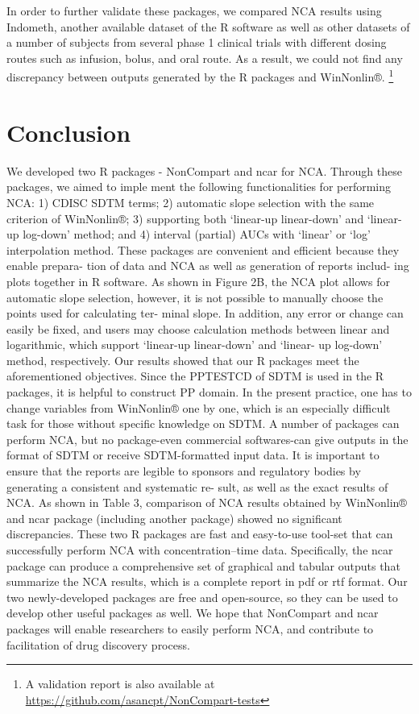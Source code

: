 \documentclass[12pt,]{krantz}
\theoremstyle{definition}
\theoremstyle{definition}
\theoremstyle{definition}
\theoremstyle{remark}
\begin{document}
In order to further validate these packages, we compared NCA results
using Indometh, another available dataset of the R software as well as
other datasets of a number of subjects from several phase 1 clinical
trials with different dosing routes such as infusion, bolus, and oral
route. As a result, we could not find any discrepancy between outputs
generated by the R packages and WinNonlin®. \footnote{A validation
  report is also available at
  \url{https://github.com/asancpt/NonCompart-tests}}

\hypertarget{conclusion}{%
\chapter{Conclusion}\label{conclusion}}

We developed two R packages - NonCompart and ncar for NCA. Through these
packages, we aimed to imple ment the following functionalities for
performing NCA: 1) CDISC SDTM terms; 2) automatic slope selection with
the same criterion of WinNonlin®; 3) supporting both `linear-up
linear-down' and `linear-up log-down' method; and 4) interval (partial)
AUCs with `linear' or `log' interpolation method. These packages are
convenient and efficient because they enable prepara- tion of data and
NCA as well as generation of reports includ- ing plots together in R
software. As shown in Figure 2B, the NCA plot allows for automatic slope
selection, however, it is not possible to manually choose the points
used for calculating ter- minal slope. In addition, any error or change
can easily be fixed, and users may choose calculation methods between
linear and logarithmic, which support `linear-up linear-down' and
`linear- up log-down' method, respectively. Our results showed that our
R packages meet the aforementioned objectives. Since the PPTESTCD of
SDTM is used in the R packages, it is helpful to construct PP domain. In
the present practice, one has to change variables from WinNonlin® one by
one, which is an especially difficult task for those without specific
knowledge on SDTM. A number of packages can perform NCA, but no
package-even commercial softwares-can give outputs in the format of SDTM
or receive SDTM-formatted input data. It is important to ensure that the
reports are legible to sponsors and regulatory bodies by generating a
consistent and systematic re- sult, as well as the exact results of NCA.
As shown in Table 3, comparison of NCA results obtained by WinNonlin®
and ncar package (including another package) showed no significant
discrepancies. These two R packages are fast and easy-to-use tool-set
that can successfully perform NCA with concentration--time data.
Specifically, the ncar package can produce a comprehensive set of
graphical and tabular outputs that summarize the NCA results, which is a
complete report in pdf or rtf format. Our two newly-developed packages
are free and open-source, so they can be used to develop other useful
packages as well. We hope that NonCompart and ncar packages will enable
researchers to easily perform NCA, and contribute to facilitation of
drug discovery process.
\end{document}
